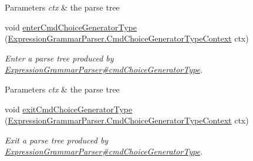 \begin{DoxyCompactItemize}
\begin{DoxyCompactList}
\begin{DoxyParams}{Parameters}
{\em ctx} & the parse tree\\
\hline
\end{DoxyParams}
 \end{DoxyCompactList}\item 
void \hyperlink{classgov_1_1nasa_1_1jpf_1_1inspector_1_1server_1_1expression_1_1parser_1_1_expression_grammar_base_listener_abe1aba0997e398a371917ca34d73bd14}{enter\+Cmd\+Choice\+Generator\+Type} (\hyperlink{classgov_1_1nasa_1_1jpf_1_1inspector_1_1server_1_1expression_1_1parser_1_1_expression_grammar_pa25195f4046c6a14884faf2c870f5b76d}{Expression\+Grammar\+Parser.\+Cmd\+Choice\+Generator\+Type\+Context} ctx)
\begin{DoxyCompactList}\small\item\em Enter a parse tree produced by \hyperlink{classgov_1_1nasa_1_1jpf_1_1inspector_1_1server_1_1expression_1_1parser_1_1_expression_grammar_parser_aa13af7ba7969feaa3eafc1383a1f42a1}{Expression\+Grammar\+Parser\#cmd\+Choice\+Generator\+Type}.


\begin{DoxyParams}{Parameters}
{\em ctx} & the parse tree\\
\hline
\end{DoxyParams}
 \end{DoxyCompactList}\item 
void \hyperlink{classgov_1_1nasa_1_1jpf_1_1inspector_1_1server_1_1expression_1_1parser_1_1_expression_grammar_base_listener_afee51fdc65631dd245ce7f92d9397580}{exit\+Cmd\+Choice\+Generator\+Type} (\hyperlink{classgov_1_1nasa_1_1jpf_1_1inspector_1_1server_1_1expression_1_1parser_1_1_expression_grammar_pa25195f4046c6a14884faf2c870f5b76d}{Expression\+Grammar\+Parser.\+Cmd\+Choice\+Generator\+Type\+Context} ctx)
\begin{DoxyCompactList}\small\item\em Exit a parse tree produced by \hyperlink{classgov_1_1nasa_1_1jpf_1_1inspector_1_1server_1_1expression_1_1parser_1_1_expression_grammar_parser_aa13af7ba7969feaa3eafc1383a1f42a1}{Expression\+Grammar\+Parser\#cmd\+Choice\+Generator\+Type}.



\end{DoxyCompactList}
\end{DoxyCompactItemize}
